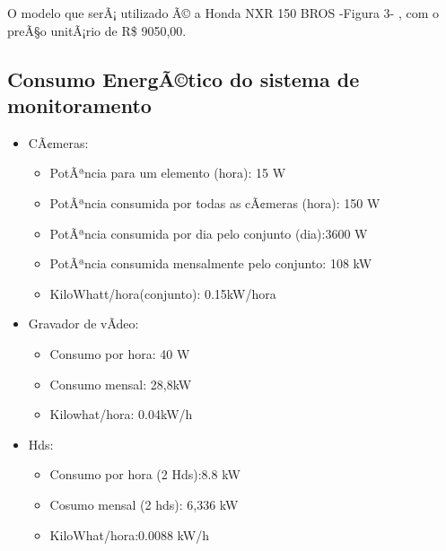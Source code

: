 O modelo que serÃ¡ utilizado Ã© a Honda NXR 150 BROS -Figura 3- , com o preÃ§o unitÃ¡rio  de R\$ 9050,00.

\subsection{Consumo EnergÃ©tico do sistema de monitoramento}

\begin{itemize}
	\item CÃ¢meras: 
	\begin{itemize}
	\item PotÃªncia para um elemento (hora): 15 W
 	\item PotÃªncia consumida por todas as cÃ¢meras (hora): 150 W
	\item PotÃªncia consumida por dia pelo conjunto (dia):3600 W
	\item PotÃªncia consumida mensalmente pelo conjunto: 108 kW
	\item KiloWhatt/hora(conjunto): 0.15kW/hora	
	\end{itemize}

	\item Gravador de vÃ­deo:
	\begin{itemize}
	\item Consumo por hora: 40 W
	\item Consumo mensal: 28,8kW
	\item Kilowhat/hora: 0.04kW/h
	\end{itemize}		
	
	\item Hds:
	\begin{itemize}
	\item Consumo por hora (2 Hds):8.8 kW
	\item Cosumo mensal (2 hds): 6,336 kW
	\item KiloWhat/hora:0.0088 kW/h
	\end{itemize}

\end{itemize}

